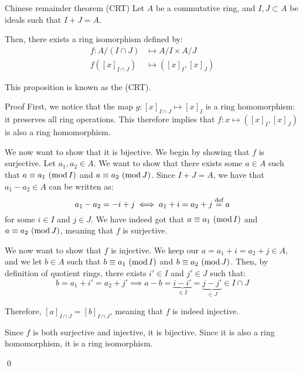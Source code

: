 \documentclass[a4paper]{article}
\begin{document}
\begin{parag}{Chinese remainder theorem (CRT)}
    Let $A$ be a commutative ring, and $I, J \subset A$ be ideals such that $I + J = A$.

    Then, there exists a ring isomorphism defined by:
    \[\begin{split}
    f:  A / \left(I \cap J\right) &\longmapsto A / I \times A / J \\
    f\left(\left[x\right]_{I \cap J}\right) &\longmapsto \left(\left[x\right]_{I}, \left[x\right]_{J}\right)
    \end{split}\]
    
    This proposition is known as the  (CRT).

    \begin{subparag}{Proof}
        First, we notice that the map $g: \left[x\right]_{I \cap J} \mapsto \left[x\right]_I$ is a ring homomorphism: it preserves all ring operations. This therefore implies that $f: x \mapsto \left(\left[x\right]_I, \left[x\right]_J\right)$ is also a ring homomorphism.

        We now want to show that it is bijective. We begin by showing that $f$ is surjective. Let $a_1, a_2 \in A$. We want to show that there exists some $a \in A$ such that $\congruent{a}{a_1}{I}$ and $\congruent{a}{a_2}{J}$. Since $I + J = A$, we have that $a_1 - a_2 \in A$ can be written as: 
        \[a_1 - a_2 = -i + j \iff a_1 + i = a_2 + j \over{=}{def} a\]
        for some $i \in I$ and $j \in J$. We have indeed got that $\congruent{a}{a_1}{I}$ and $\congruent{a}{a_2}{J}$, meaning that $f$ is surjective.

        We now want to show that $f$ is injective. We keep our $a = a_1 + i = a_2 + j \in A$, and we let $b \in A$ such that $\congruent{b}{a_1}{I}$ and $\congruent{b}{a_2}{J}$. Then, by definition of quotient rings, there exists $i' \in I$ and $j' \in J$ such that: 
        \[b = a_1 + i' = a_2 + j' \implies a - b = \underbrace{i - i'}_{\in I} = \underbrace{j - j'}_{\in J} \in I \cap J\]
        
        Therefore, $\left[a\right]_{I \cap J} = \left[b\right]_{I \cap J}$, meaning that $f$ is indeed injective.

        Since $f$ is both surjective and injective, it is bijective. Since it is also a ring homomorphism, it is a ring isomorphism.

        \qed
    \end{subparag}
\end{parag}
\end{document}
